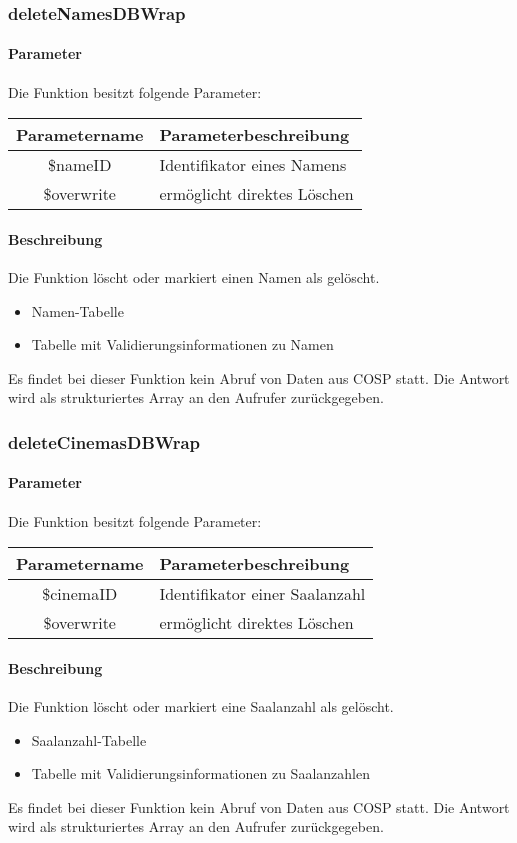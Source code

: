 \subsubsection{deleteNamesDBWrap}
\paragraph{Parameter} Die Funktion besitzt folgende Parameter:
\begin{table}[H]
	\begin{tabular}{|c|p{11cm}|}
		\hline
		\textbf{Parametername} & \textbf{Parameterbeschreibung} \\ \hline
		\$nameID    & Identifikator eines Namens \\ \hline
		\$overwrite & ermöglicht direktes Löschen \\ \hline
	\end{tabular}
\end{table}
\paragraph{Beschreibung} Die Funktion löscht oder markiert einen Namen als gelöscht.
\begin{itemize}
	\item Namen-Tabelle
	\item Tabelle mit Validierungsinformationen zu Namen
\end{itemize}
Es findet bei dieser Funktion kein Abruf von Daten aus {\glqq COSP\grqq} statt. Die Antwort wird als strukturiertes Array an den Aufrufer zurückgegeben.
\subsubsection{deleteCinemasDBWrap}
\paragraph{Parameter} Die Funktion besitzt folgende Parameter:
\begin{table}[H]
	\begin{tabular}{|c|p{11cm}|}
		\hline
		\textbf{Parametername} & \textbf{Parameterbeschreibung} \\ \hline
		\$cinemaID  & Identifikator einer Saalanzahl \\ \hline
		\$overwrite & ermöglicht direktes Löschen \\ \hline
	\end{tabular}
\end{table}
\paragraph{Beschreibung} Die Funktion löscht oder markiert eine Saalanzahl als gelöscht.
\begin{itemize}
	\item Saalanzahl-Tabelle
	\item Tabelle mit Validierungsinformationen zu Saalanzahlen
\end{itemize}
Es findet bei dieser Funktion kein Abruf von Daten aus {\glqq COSP\grqq} statt. Die Antwort wird als strukturiertes Array an den Aufrufer zurückgegeben.
